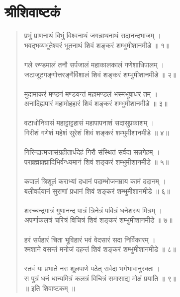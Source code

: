 \section{\sanskrit श्रीशिवाष्टकं }
\begin{quotation}\chandas
प्रभुं प्राणनाथं विभुं विश्वनाथं जगन्नाथनाथं सदानन्दभाजम् ।\\
भवद्भव्यभूतेश्वरं भूतनाथं शिवं शङ्करं शम्भुमीशानमीडे ॥ १॥\\
\\
गले रुण्डमालं तनौ सर्पजालं महाकालकालं गणेशाधिपालम् ।\\
जटाजूटगङ्गोत्तरङ्गैर्विशालं शिवं शङ्करं शम्भुमीशानमीडे ॥ २॥\\
\\
मुदामाकरं मण्डनं मण्डयन्तं महामण्डलं भस्मभूषाधरं तम् ।\\
अनादिह्यपारं महामोहहारं शिवं शङ्करं शम्भुमीशानमीडे ॥ ३॥\\
\\
वटाधोनिवासं महाट्टाट्टहासं महापापनाशं सदासुप्रकाशम् ।\\
गिरीशं गणेशं महेशं सुरेशं शिवं शङ्करं शम्भुमीशानमीडे ॥ ४॥\\
\\
गिरिन्द्रात्मजासंग्रहीतार्धदेहं गिरौ संस्थितं सर्वदा सन्नगेहम् ।\\
परब्रह्मब्रह्मादिभिर्वन्ध्यमानं शिवं शङ्करं शम्भुमीशानमीडे ॥ ५॥\\
\\
कपालं त्रिशूलं कराभ्यां दधानं पदाम्भोजनम्राय कामं ददानम् ।\\
बलीवर्दयानं सुराणां प्रधानं शिवं शङ्करं शम्भुमीशानमीडे ॥ ६॥\\
\\
शरच्चन्द्रगात्रं गुणानन्द पात्रं त्रिनेत्रं पवित्रं धनेशस्य मित्रम् ।\\
अपर्णाकलत्रं चरित्रं विचित्रं शिवं शङ्करं शम्भुमीशानमीडे ॥ ७॥\\
\\
हरं सर्पहारं चिता भूविहारं भवं वेदसारं सदा निर्विकारम् ।\\
श्मशाने वसन्तं मनोजं दहन्तं शिवं शङ्करं शम्भुमीशानमीडे ॥ ८॥\\
\\
स्तवं यः प्रभाते नरः शूलपाणे पठेत् सर्वदा भर्गभावानुरक्तः ।\\
स पुत्रं धनं धान्यमित्रं कलत्रं विचित्रं समासाद्य मोक्षं प्रयाति ॥ ९॥\\
॥ इति शिवाष्टकम् ॥\\
\end{quotation}

